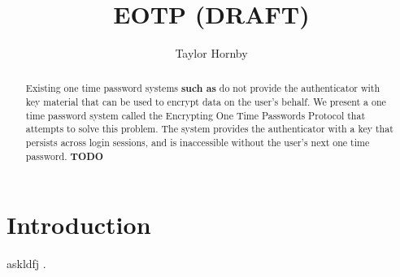 \documentclass[letterpaper,twocolumn,10pt]{article} %
\title{EOTP (DRAFT)}
\author{Taylor Hornby}
\begin{document}
\maketitle

\begin{abstract}
Existing one time password systems \textbf{such as} do not provide the authenticator with key
material that can be used to encrypt data on the user's behalf. We present a one
time password system called the Encrypting One Time Passwords Protocol that
attempts to solve this problem. The system provides the authenticator with
a key that persists across login sessions, and is inaccessible without the
user's next one time password. \textbf{TODO}
\end{abstract}

\section{Introduction}

askldfj \citep{Shwartz2011QHardening}.




\end{document}
